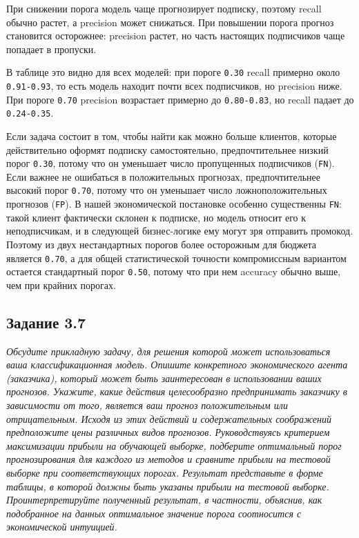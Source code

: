\documentclass[11pt]{article}
\newenvironment{tasktext}
      {\begin{tcolorbox}[breakable, colback=black!3, colframe=black!28,
        boxrule=0.4pt, arc=1.5mm, left=7pt, right=7pt, top=5pt, bottom=5pt,
        before skip=0.35em, after skip=0.75em]\itshape}
      {\end{tcolorbox}}
\begin{document}
    При снижении порога модель чаще прогнозирует подписку, поэтому recall
обычно растет, а precision может снижаться. При повышении порога прогноз
становится осторожнее: precision растет, но часть настоящих подписчиков
чаще попадает в пропуски.

В таблице это видно для всех моделей: при пороге \texttt{0.30} recall
примерно около \texttt{0.91-0.93}, то есть модель находит почти всех
подписчиков, но precision ниже. При пороге \texttt{0.70} precision
возрастает примерно до \texttt{0.80-0.83}, но recall падает до
\texttt{0.24-0.35}.

Если задача состоит в том, чтобы найти как можно больше клиентов,
которые действительно оформят подписку самостоятельно, предпочтительнее
низкий порог \texttt{0.30}, потому что он уменьшает число пропущенных
подписчиков (\texttt{FN}). Если важнее не ошибаться в положительных
прогнозах, предпочтительнее высокий порог \texttt{0.70}, потому что он
уменьшает число ложноположительных прогнозов (\texttt{FP}). В нашей
экономической постановке особенно существенны \texttt{FN}: такой клиент
фактически склонен к подписке, но модель относит его к неподписчикам, и
в следующей бизнес-логике ему могут зря отправить промокод. Поэтому из
двух нестандартных порогов более осторожным для бюджета является
\texttt{0.70}, а для общей статистической точности компромиссным
вариантом остается стандартный порог \texttt{0.50}, потому что при нем
accuracy обычно выше, чем при крайних порогах.

    \subsection{Задание 3.7}\label{ux437ux430ux434ux430ux43dux438ux435-3.7}

\begin{tasktext}
Обсудите прикладную задачу, для решения которой может использоваться
ваша классификационная модель. Опишите конкретного экономического агента
(заказчика), который может быть заинтересован в использовании ваших
прогнозов. Укажите, какие действия целесообразно предпринимать заказчику
в зависимости от того, является ваш прогноз положительным или
отрицательным. Исходя из этих действий и содержательных соображений
предположите цены различных видов прогнозов. Руководствуясь критерием
максимизации прибыли на обучающей выборке, подберите оптимальный порог
прогнозирования для каждого из методов и сравните прибыли на тестовой
выборке при соответствующих порогах. Результат представьте в форме
таблицы, в которой должны быть указаны прибыли на тестовой выборке.
Проинтерпретируйте полученный результат, в частности, объяснив, как
подобранное на данных оптимальное значение порога соотносится с
экономической интуицией.
\end{tasktext}
\end{document}
